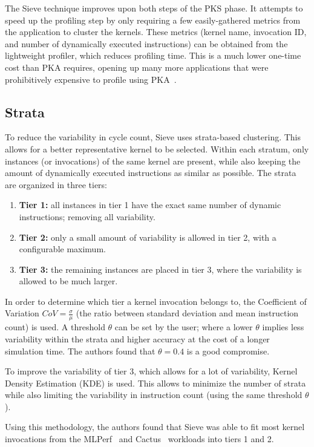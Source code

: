 The Sieve technique improves upon both steps of the PKS phase.
It attempts to speed up the profiling step by only requiring a few easily-gathered metrics from the application to cluster the kernels.
These metrics (kernel name, invocation ID, and number of dynamically executed instructions) can be obtained from the lightweight profiler, which reduces profiling time.
This is a much lower one-time cost than PKA requires, opening up many more applications that were prohibitively expensive to profile using PKA\ .

\subsection{Strata}\label{subsec:strata}
To reduce the variability in cycle count, Sieve uses strata-based clustering.
This allows for a better representative kernel to be selected.
Within each stratum, only instances (or invocations) of the same kernel are present, while also keeping the amount of dynamically executed instructions as similar as possible.
The strata are organized in three tiers:
\begin{enumerate}
    \item \textbf{Tier 1:} all instances in tier 1 have the exact same number of dynamic instructions; removing all variability.
    \item \textbf{Tier 2:} only a small amount of variability is allowed in tier 2, with a configurable maximum.
    \item \textbf{Tier 3:} the remaining instances are placed in tier 3, where the variability is allowed to be much larger.
\end{enumerate}
In order to determine which tier a kernel invocation belongs to, the Coefficient of Variation $CoV = \frac{\sigma}{\mu}$ (the ratio between standard deviation and mean instruction count) is used.
A threshold $\theta$ can be set by the user; where a lower $\theta$ implies less variability within the strata and higher accuracy at the cost of a longer simulation time.
The authors found that $\theta = 0.4$ is a good compromise.

To improve the variability of tier 3, which allows for a lot of variability, Kernel Density Estimation (KDE) is used.
This allows to minimize the number of strata while also limiting the variability in instruction count (using the same threshold $\theta$).

Using this methodology, the authors found that Sieve was able to fit most kernel invocations from the MLPerf~\cite{mlperf} and Cactus~\cite{cactus} workloads into tiers 1 and 2.

